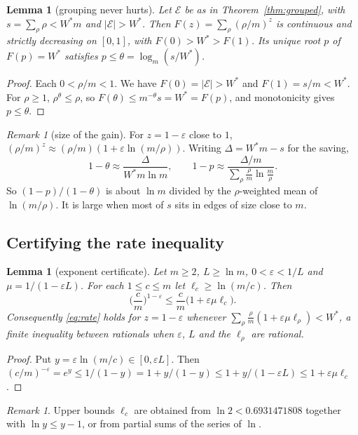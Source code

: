 \documentclass[11pt]{article}
\newtheorem{lemma}[theorem]{Lemma}
\theoremstyle{definition}
\theoremstyle{remark}
\newtheorem{remark}[theorem]{Remark}
\newcommand{\E}{\mathcal{E}}
\begin{document}
\begin{lemma}[grouping never hurts]\label{lem:ptheta}
Let $\E$ be as in Theorem~\ref{thm:grouped}, with $s=\sum_\rho\rho<W^*m$ and $|\E|>W^*$. Then
$F(z)=\sum_\rho(\rho/m)^z$ is continuous and strictly decreasing on $[0,1]$, with $F(0)>W^*>F(1)$.
Its unique root $p$ of $F(p)=W^*$ satisfies $p\le\theta=\log_m(s/W^*)$.
\end{lemma}
\begin{proof}
Each $0<\rho/m<1$. We have $F(0)=|\E|>W^*$ and $F(1)=s/m<W^*$. For $\rho\ge1$, $\rho^\theta\le\rho$, so
$F(\theta)\le m^{-\theta}s=W^*=F(p)$, and monotonicity gives $p\le\theta$.
\end{proof}

\begin{remark}[size of the gain]\label{rem:gain}
For $z=1-\varepsilon$ close to $1$, $(\rho/m)^{z}\approx(\rho/m)(1+\varepsilon\ln(m/\rho))$. Writing
$\Delta=W^*m-s$ for the saving,
\[
  1-\theta\approx\frac{\Delta}{W^*m\ln m},\qquad
  1-p\approx\frac{\Delta/m}{\sum_\rho\frac\rho m\ln\frac m\rho}.
\]
So $(1-p)/(1-\theta)$ is about $\ln m$ divided by the $\rho$-weighted mean of $\ln(m/\rho)$. It is large
when most of $s$ sits in edges of size close to $m$.
\end{remark}

\subsection{Certifying the rate inequality}
\begin{lemma}[exponent certificate]\label{lem:certificate}
Let $m\ge2$, $L\ge\ln m$, $0<\varepsilon<1/L$ and $\mu=1/(1-\varepsilon L)$. For each $1\le c\le m$ let
$\ell_c\ge\ln(m/c)$. Then
\[
  \Big(\frac cm\Big)^{1-\varepsilon}\le\frac cm\big(1+\varepsilon\mu\ell_c\big).
\]
Consequently \eqref{eq:rate} holds for $z=1-\varepsilon$ whenever
$\sum_\rho\frac\rho m(1+\varepsilon\mu\ell_\rho)<W^*$, a finite inequality between rationals when
$\varepsilon$, $L$ and the $\ell_\rho$ are rational.
\end{lemma}
\begin{proof}
Put $y=\varepsilon\ln(m/c)\in[0,\varepsilon L]$. Then $(c/m)^{-\varepsilon}=e^y\le1/(1-y)=1+y/(1-y)\le
1+y/(1-\varepsilon L)\le1+\varepsilon\mu\ell_c$.
\end{proof}

\begin{remark}
Upper bounds $\ell_c$ are obtained from $\ln2<0.6931471808$ together with $\ln y\le y-1$, or from
partial sums of the series of $\ln$.
\end{remark}
\end{document}
